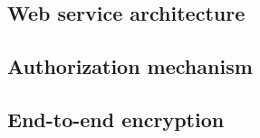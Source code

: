 \subsection{Web service architecture}\label{subsec:web-service-architecture}


\subsection{Authorization mechanism}\label{subsec:authorization-mechanism}


\subsection{End-to-end encryption}\label{subsec:end-to-end-encryption}
